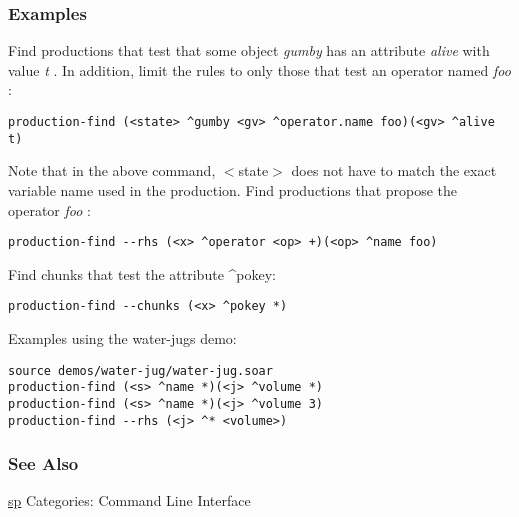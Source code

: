 \subsubsection*{Examples}
 Find productions that test that some object \emph{gumby}
 has an attribute \emph{alive}
 with value \emph{t}
. In addition, limit the rules to only those that test an operator named \emph{foo}
: \begin{verbatim}
production-find (<state> ^gumby <gv> ^operator.name foo)(<gv> ^alive t)
\end{verbatim}
 Note that in the above command, $<$state$>$ does not have to match the exact variable name used in the production. 
 Find productions that propose the operator \emph{foo}
: \begin{verbatim}
production-find --rhs (<x> ^operator <op> +)(<op> ^name foo)
\end{verbatim}
 Find chunks that test the attribute \^{}pokey: \begin{verbatim}
production-find --chunks (<x> ^pokey *)
\end{verbatim}
 Examples using the water-jugs demo: \begin{verbatim}
source demos/water-jug/water-jug.soar
production-find (<s> ^name *)(<j> ^volume *)
production-find (<s> ^name *)(<j> ^volume 3)
production-find --rhs (<j> ^* <volume>)
\end{verbatim}
\subsubsection*{See Also}
\hyperref[sp]{sp}  Categories: Command Line Interface
